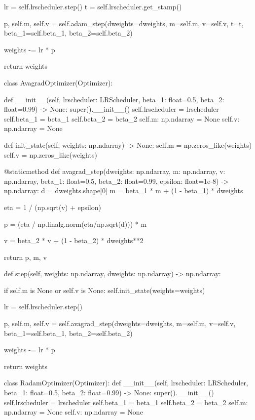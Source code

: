 \documentclass[14pt, a4paper]{article}
\theoremstyle{sltheorem}
\theoremstyle{soltheorem}
\begin{document}
\begin{python}
        lr = self.lrscheduler.step()
        t = self.lrscheduler.get_stamp()
        
        p, self.m, self.v = self.adam_step(dweights=dweights, m=self.m, v=self.v, t=t,
                                           beta_1=self.beta_1, beta_2=self.beta_2)
        
        weights -= lr * p
        
        return weights
    
    
class AvagradOptimizer(Optimizer):
    
    def __init__(self, lrscheduler: LRScheduler, beta_1: float=0.5, beta_2: float=0.99) -> None:
        super().__init__()
        self.lrscheduler = lrscheduler
        self.beta_1 = beta_1
        self.beta_2 = beta_2
        self.m: np.ndarray = None
        self.v: np.ndarray = None
        
    def init_state(self, weights: np.ndarray) -> None:
        self.m = np.zeros_like(weights)
        self.v = np.zeros_like(weights)
    
    @staticmethod    
    def avagrad_step(dweights: np.ndarray, m: np.ndarray, v: np.ndarray, beta_1: float=0.5, beta_2: float=0.99, epsilon: float=1e-8) -> np.ndarray:
        d = dweights.shape[0]
        m = beta_1 * m + (1 - beta_1) * dweights

        eta = 1 / (np.sqrt(v) + epsilon)

        p = (eta / np.linalg.norm(eta/np.sqrt(d))) * m

        v = beta_2 * v + (1 - beta_2) * dweights**2

        return p, m, v
    
    def step(self, weights: np.ndarray, dweights: np.ndarray) -> np.ndarray:
        
        if self.m is None or self.v is None:
            self.init_state(weights=weights)
            
        
        lr = self.lrscheduler.step()
        
        p, self.m, self.v = self.avagrad_step(dweights=dweights, m=self.m, v=self.v, beta_1=self.beta_1, beta_2=self.beta_2)
        
        weights -= lr * p
        
        return weights
        

class RadamOptimizer(Optimizer):
    def __init__(self, lrscheduler: LRScheduler, beta_1: float=0.5, beta_2: float=0.99) -> None:
        super().__init__()
        self.lrscheduler = lrscheduler
        self.beta_1 = beta_1
        self.beta_2 = beta_2
        self.m: np.ndarray = None
        self.v: np.ndarray = None
        

\end{python}
\end{document}
